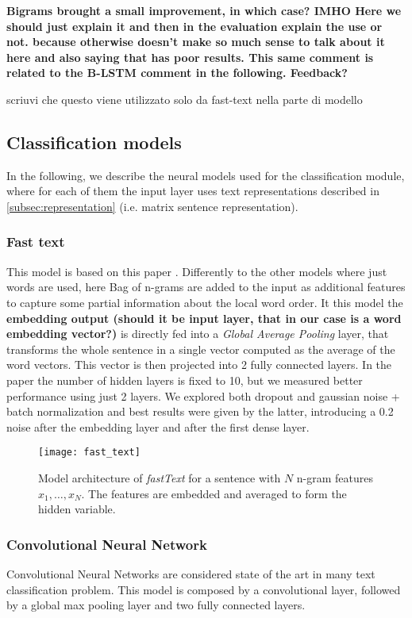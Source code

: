\textbf{Bigrams brought a small improvement, in which case? IMHO Here we should just explain it and then in the evaluation explain the use or not. because otherwise doesn't make so much sense to talk about it here and also saying that has poor results. This same comment is related to the B-LSTM comment in the following. Feedback?}

scriuvi che questo viene utilizzato solo da fast-text nella parte di modello


\subsection{Classification models} \label{subsec:classificationModel}


In the following, we describe the neural models used for the classification module, where for each of them the input layer uses text representations described in \cref{subsec:representation} (i.e. matrix sentence representation).


\subsubsection{Fast text}
This model is based on this paper \cite{joulin2016bag}.
Differently to the other models where just words are used, here Bag of n-grams are added to the input as  additional features to capture some partial information about the local word order.
It this model the \textbf{embedding output (should it be input layer, that in our case is a word embedding vector?)} is directly fed into a \emph{Global Average Pooling} layer, that transforms the whole sentence in a single vector computed as the average of the word vectors.
This vector is then projected into 2 fully connected layers. In the paper the number of hidden layers is fixed to 10, but we measured better performance using just 2 layers.
We explored both dropout and gaussian noise + batch normalization and best results were given by the latter, introducing a 0.2 noise after the embedding layer and after the first dense layer.
\begin{figure}[h]
	\centering
	\texttt{[image: fast\_text]}
	\caption{\cite{joulin2016bag} Model architecture of \emph{fastText} for a sentence with $N$ n-gram features $x_1,\dots,x_N$. The features are embedded and averaged to form the hidden variable.}
	\label{fig:fastText}
\end{figure}


\subsubsection{Convolutional Neural Network}
Convolutional Neural Networks are considered state of the art in many text classification problem.
This model is composed by a convolutional layer, followed by a global max pooling layer and two fully connected layers.

